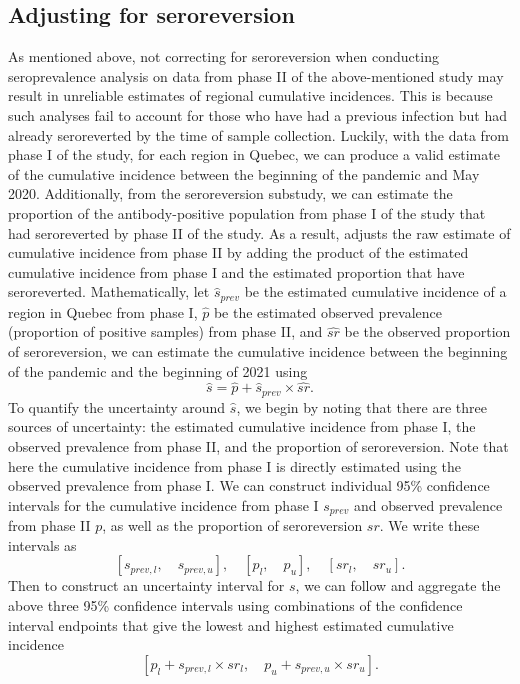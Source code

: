 \subsection{Adjusting for seroreversion}\label{sec:adjust_reversion}
As mentioned above, not correcting for seroreversion when conducting seroprevalence analysis on data from phase II of the above-mentioned study may result in unreliable estimates of regional cumulative incidences. This is because such analyses fail to account for those who have had a previous infection but had already seroreverted by the time of sample collection. Luckily, with the data from phase I of the study, for each region in Quebec, we can produce a valid estimate of the cumulative incidence between the beginning of the pandemic and May 2020. Additionally, from the seroreversion substudy, we can estimate the proportion of the antibody-positive population from phase I of the study that had seroreverted by phase II of the study. As a result, \cite{lewin2022seroprevalence} adjusts the raw estimate of cumulative incidence from phase II by adding the product of the estimated cumulative incidence from phase I and the estimated proportion that have seroreverted. Mathematically, let $\hat{s}_{prev}$ be the estimated cumulative incidence of a region in Quebec from phase I, $\hat{p}$ be the estimated observed prevalence (proportion of positive samples) from phase II, and $\hat{sr}$ be the observed proportion of seroreversion, we can estimate the cumulative incidence between the beginning of the pandemic and the beginning of 2021 using
\[
\hat{s} = \hat{p} + \hat{s}_{prev} \times \hat{sr}.
\]
To quantify the uncertainty around $\hat{s}$, we begin by noting that there are three sources of uncertainty: the estimated cumulative incidence from phase I, the observed prevalence from phase II, and the proportion of seroreversion. Note that here the cumulative incidence from phase I is directly estimated using the observed prevalence from phase I. We can construct individual 95\% confidence intervals for the cumulative incidence from phase I $s_{prev}$ and observed prevalence from phase II $p$, as well as the proportion of seroreversion $sr$. We write these intervals as
\[
[s_{prev, l},\quad s_{prev, u}], \quad [p_{l},\quad p_{u}], \quad [sr_{l},\quad sr_{u}].
\]
Then to construct an uncertainty interval for $s$, we can follow \cite{meyer2022adjusting} and aggregate the above three 95\% confidence intervals using combinations of the confidence interval endpoints that give the lowest and highest estimated cumulative incidence
\[
[p_l + s_{prev, l} \times sr_{l}, \quad p_u + s_{prev, u} \times sr_{u}].
\]
